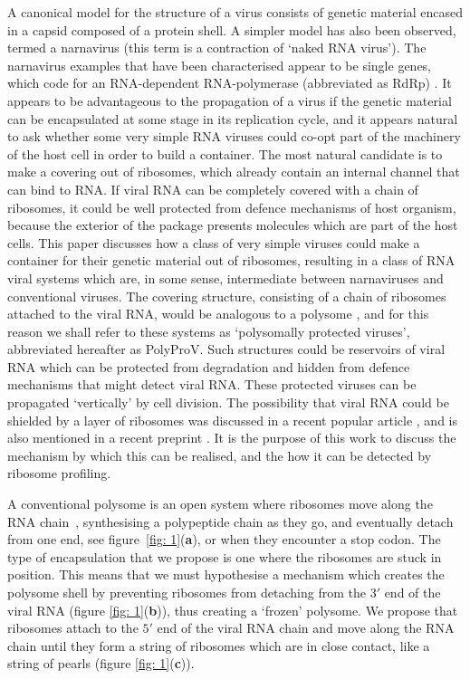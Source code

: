 \documentclass[12pt]{iopart}
\begin{document}
A canonical model for the structure of a virus \cite{Cob+16} consists of genetic material 
encased in a capsid composed of a protein shell. A simpler model has also been observed, termed a 
narnavirus (this term is a contraction of \lq naked RNA virus'). The narnavirus examples that have 
been characterised appear to be single genes, which code for an RNA-dependent RNA-polymerase
(abbreviated as RdRp) \cite{Hillman2013}. It appears to be advantageous to the 
propagation of a virus if the genetic material can be encapsulated at 
some stage in its replication cycle, and it appears natural to ask whether 
some very simple RNA viruses could co-opt part of the machinery of the host cell in order to 
build a container. The most natural candidate is to make a covering out of ribosomes, which 
already contain an internal channel that can bind to RNA. 
If viral RNA can be completely covered with a chain of ribosomes, it could be well 
protected from defence mechanisms of host organism, because the exterior of the package presents 
molecules which are part of the host cells. This paper discusses how a class of very simple viruses 
could make a container for their genetic material out of ribosomes, resulting in a class of RNA viral 
systems which are, in some sense, intermediate between narnaviruses and conventional viruses. 
The covering structure, consisting of a chain of ribosomes attached to the viral RNA, would be 
analogous to a polysome \cite{Nol08,Sin96,Chr+99,Bra+09}, and for this reason we shall refer to these systems 
as \lq polysomally protected viruses', abbreviated hereafter as PolyProV. Such structures could be 
reservoirs of viral RNA which can be protected from degradation and hidden from defence 
mechanisms that might detect viral RNA. These protected viruses can be propagated 
\lq vertically' by cell division. The possibility that viral RNA could be shielded by 
a layer of ribosomes was discussed in a recent popular article \cite{Cep20}, and is also 
mentioned in a recent preprint \cite{Ret+20}. It is the purpose of this work to discuss the 
mechanism by which this can be realised, and the how it can be detected by ribosome profiling.

A conventional polysome is an open system where ribosomes move along the RNA 
chain~\cite{Nol08,Sin96,Chr+99,Bra+09},
synthesising a polypeptide chain as they go, and eventually detach from one end, see figure~\ref{fig: 1}({\bf a}), or
when they encounter a stop codon. 
The type of encapsulation that we propose is one where the ribosomes are stuck in position. 
This means that we must hypothesise a mechanism which creates the polysome shell by preventing 
ribosomes from detaching from the $3'$ end of the viral RNA (figure \ref{fig: 1}({\bf b})), thus 
creating a \lq frozen' polysome.  We propose that ribosomes attach to the $5'$ end of the viral RNA 
chain and move along the RNA chain until they form a string of ribosomes which are in close contact, 
like a string of pearls (figure \ref{fig: 1}({\bf c})).
\end{document}
